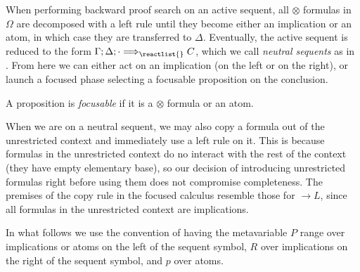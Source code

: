When performing backward proof search on an active sequent, all $\otimes$
formulas in $\Omega$ are decomposed with a left rule until they become either an
implication or an atom, in which case they are transferred to
$\Delta$. Eventually, the active sequent is reduced to the form
$\ztriseq{\Gamma}{\Delta}{\cdot}{\reactlist{}}{C}$, which we call \emph{neutral
  sequents} as in \cite{chaudhuri-thesis}. From here we can either act on an
implication (on the left or on the right), or launch a focused phase selecting a
focusable proposition on the conclusion.

\begin{definition}
  A proposition is \emph{focusable} if it is a $\otimes$ formula or an atom.
\end{definition}

When we are on a neutral sequent, we may also copy a formula out of the
unrestricted context and immediately use a left rule on it. This is because
formulas in the unrestricted context do no interact with the rest of the context
(they have empty elementary base), so our decision of introducing unrestricted
formulas right before using them does not compromise completeness. The premises
of the copy rule in the focused calculus resemble those for $\rightarrow L$,
since all formulas in the unrestricted context are implications.

In what follows we use the convention of having the metavariable $P$ range over
implications or atoms on the left of the sequent symbol, $R$ over implications
on the right of the sequent symbol, and $p$ over atoms.

